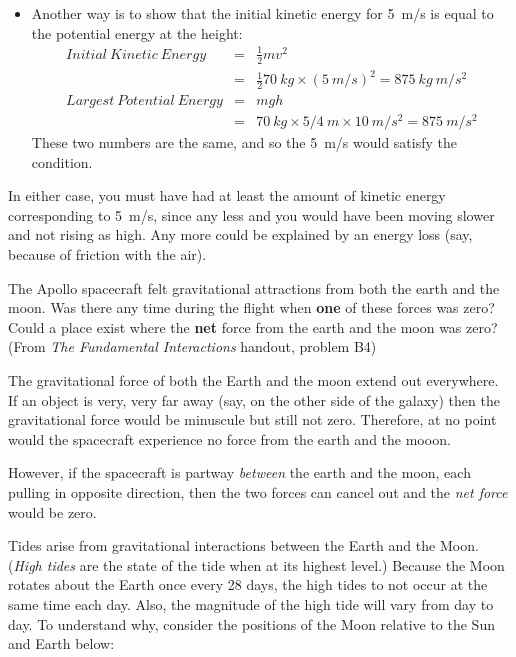 \documentclass[addpoints,12pt]{exam}
\begin{document}
\begin{questions}
\begin{parts}
\begin{TheSolution}
\begin{itemize}
			\item Another way is to show that the initial kinetic energy for 5~m/s is equal to the potential energy at the height:
			\begin{eqnarray}
			Initial~Kinetic~Energy &=& \frac{1}{2}mv^2 \nonumber\\
			&=&\frac{1}{2}70~kg\times(5~ m/s)^2 = 875~kg~m/s^2\nonumber \\
			Largest~Potential~Energy &=& mgh \nonumber\\
			&=& 70~kg\times 5/4~m \times 10~m/s^2 = 875~m/s^2 \nonumber
			\end{eqnarray}
			These two numbers are the same, and so the 5~m/s would satisfy the condition.
			\end{itemize}
			In either case, you must have had at least the amount of kinetic energy corresponding to 5~m/s, since any less and you would have been moving slower and not rising as high. Any more could be explained by an energy loss (say, because of friction with the air).
			\end{TheSolution}
	\end{parts}	
\question[4]
	The Apollo spacecraft felt gravitational attractions from both the earth and the moon. Was there any time during the flight when \textbf{one} of these forces was zero? Could a place exist where the \textbf{net} force from the earth and the moon was zero? (From \textit{The Fundamental Interactions} handout, problem B4)
		\begin{TheSolution}
		The gravitational force of both the Earth and the moon extend out everywhere. If an object is very, very far away (say, on the other side of the galaxy) then the gravitational force would be minuscule but still not zero. Therefore, at no point would the spacecraft experience no force from the earth and the mooon.
		
		However, if the spacecraft is partway \textit{between} the earth and the moon, each pulling in opposite direction, then the two forces can cancel out and the \textit{net force} would be zero.
		\end{TheSolution}
	
\question[6]
	Tides arise from gravitational interactions between the Earth and the Moon. (\textit{High tides} are the state of the tide when at its highest level.) Because the Moon rotates about the Earth once every 28 days, the high tides to not occur at the same time each day. Also, the magnitude of the high tide will vary from day to day. To understand why, consider the positions of the Moon relative to the Sun and Earth below:
	\begin{center}
	
	\end{center}
	\begin{parts}

\end{parts}
\end{questions}
\end{document}
